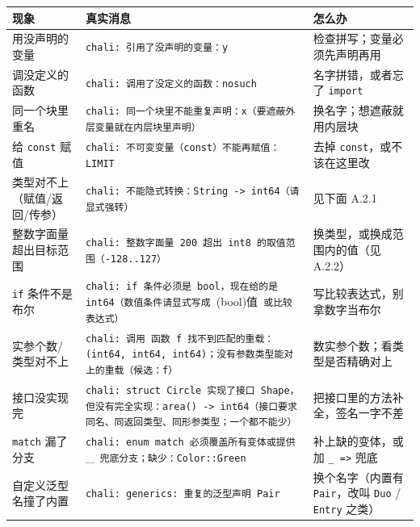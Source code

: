 {\small\setlength{\tabcolsep}{4pt}
\begin{longtable}{>{\raggedright\arraybackslash}p{}>{\raggedright\arraybackslash}p{}>{\raggedright\arraybackslash}p{}}
\toprule
现象 & 真实消息 & 怎么办 \\
\midrule
\endhead
用没声明的变量 & \texttt{chali:\allowbreak{} 引用了没声明的变量：y} & 检查拼写；变量必须先声明再用 \\
调没定义的函数 & \texttt{chali:\allowbreak{} 调用了没定义的函数：nosuch} & 名字拼错，或者忘了 \texttt{import} \\
同一个块里重名 & \texttt{chali:\allowbreak{} 同一个块里不能重复声明：x（要遮蔽外层变量就在内层块里声明）} & 换名字；想遮蔽就用内层块 \\
给 \texttt{const} 赋值 & \texttt{chali:\allowbreak{} 不可变变量（const）不能再赋值：LIMIT} & 去掉 \texttt{const}，或不该在这里改 \\
类型对不上（赋值/返回/传参） & \texttt{chali:\allowbreak{} 不能隐式转换：String ->\allowbreak{} int64（请显式强转）} & 见下面 A.2.1 \\
整数字面量超出目标范围 & \texttt{chali:\allowbreak{} 整数字面量 200 超出 int8 的取值范围（-128.\allowbreak{}.\allowbreak{}127）} & 换类型，或换成范围内的值（见 A.2.2） \\
\texttt{if} 条件不是布尔 & \texttt{chali:\allowbreak{} if 条件必须是 bool，现在给的是 int64（数值条件请显式写成 }(bool)值\texttt{ 或比较表达式）} & 写比较表达式，别拿数字当布尔 \\
实参个数/类型对不上 & \texttt{chali:\allowbreak{} 调用 函数 f 找不到匹配的重载：(\allowbreak{}int64,\allowbreak{} int64,\allowbreak{} int64)\allowbreak{}；没有参数类型能对上的重载（候选：f）} & 数实参个数；看类型是否精确对上 \\
接口没实现完 & \texttt{chali:\allowbreak{} struct Circle 实现了接口 Shape，但没有完全实现：area(\allowbreak{})\allowbreak{} ->\allowbreak{} int64（接口要求同名、同返回类型、同形参类型；一个都不能少）} & 把接口里的方法补全，签名一字不差 \\
\texttt{match} 漏了分支 & \texttt{chali:\allowbreak{} enum match 必须覆盖所有变体或提供 }\_\texttt{ 兜底分支；缺少：Color:\allowbreak{}:\allowbreak{}Green} & 补上缺的变体，或加 \texttt{\_ =\allowbreak{}>\allowbreak{}} 兜底 \\
自定义泛型名撞了内置 & \texttt{chali:\allowbreak{} generics:\allowbreak{} 重复的泛型声明 Pair} & 换个名字（内置有 \texttt{Pair}，改叫 \texttt{Duo} / \texttt{Entry} 之类） \\

\end{longtable}}
